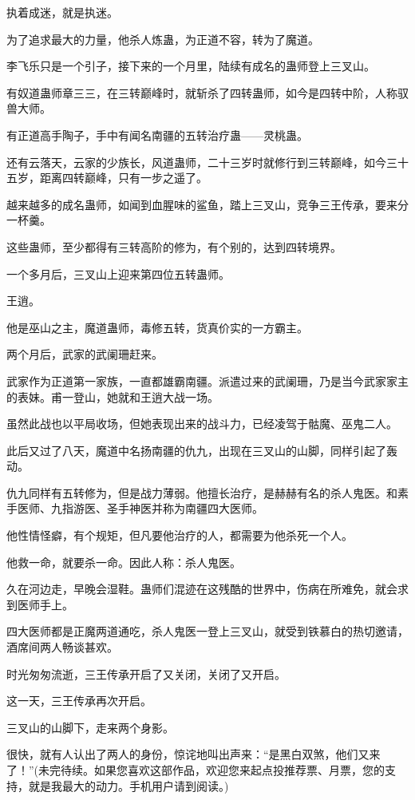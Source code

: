\begin{this_body}
执着成迷，就是执迷。

为了追求最大的力量，他杀人炼蛊，为正道不容，转为了魔道。

李飞乐只是一个引子，接下来的一个月里，陆续有成名的蛊师登上三叉山。

有奴道蛊师章三三，在三转巅峰时，就斩杀了四转蛊师，如今是四转中阶，人称驭兽大师。

有正道高手陶子，手中有闻名南疆的五转治疗蛊——灵桃蛊。

还有云落天，云家的少族长，风道蛊师，二十三岁时就修行到三转巅峰，如今三十五岁，距离四转巅峰，只有一步之遥了。

越来越多的成名蛊师，如闻到血腥味的鲨鱼，踏上三叉山，竞争三王传承，要来分一杯羹。

这些蛊师，至少都得有三转高阶的修为，有个别的，达到四转境界。

一个多月后，三叉山上迎来第四位五转蛊师。

王逍。

他是巫山之主，魔道蛊师，毒修五转，货真价实的一方霸主。

两个月后，武家的武阑珊赶来。

武家作为正道第一家族，一直都雄霸南疆。派遣过来的武阑珊，乃是当今武家家主的表妹。甫一登山，她就和王逍大战一场。

虽然此战也以平局收场，但她表现出来的战斗力，已经凌驾于骷魔、巫鬼二人。

此后又过了八天，魔道中名扬南疆的仇九，出现在三叉山的山脚，同样引起了轰动。

仇九同样有五转修为，但是战力薄弱。他擅长治疗，是赫赫有名的杀人鬼医。和素手医师、九指游医、圣手神医并称为南疆四大医师。

他性情怪癖，有个规矩，但凡要他治疗的人，都需要为他杀死一个人。

他救一命，就要杀一命。因此人称：杀人鬼医。

久在河边走，早晚会湿鞋。蛊师们混迹在这残酷的世界中，伤病在所难免，就会求到医师手上。

四大医师都是正魔两道通吃，杀人鬼医一登上三叉山，就受到铁慕白的热切邀请，酒席间两人畅谈甚欢。

时光匆匆流逝，三王传承开启了又关闭，关闭了又开启。

这一天，三王传承再次开启。

三叉山的山脚下，走来两个身影。

很快，就有人认出了两人的身份，惊诧地叫出声来：“是黑白双煞，他们又来了！”(未完待续。如果您喜欢这部作品，欢迎您来起点投推荐票、月票，您的支持，就是我最大的动力。手机用户请到阅读。)

\end{this_body}

